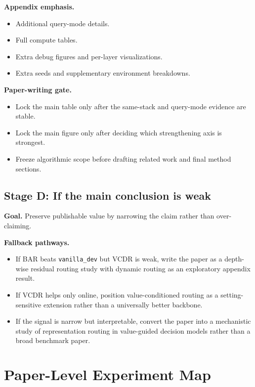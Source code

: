 \documentclass[11pt]{article}
\newcommand{\vanilla}{\texttt{vanilla\_dev}}
\begin{document}
\textbf{Appendix emphasis.}
\begin{itemize}
  \item Additional query-mode details.
  \item Full compute tables.
  \item Extra debug figures and per-layer visualizations.
  \item Extra seeds and supplementary environment breakdowns.
\end{itemize}

\textbf{Paper-writing gate.}
\begin{itemize}
  \item Lock the main table only after the same-stack and query-mode evidence are stable.
  \item Lock the main figure only after deciding which strengthening axis is strongest.
  \item Freeze algorithmic scope before drafting related work and final method sections.
\end{itemize}

\subsection*{Stage D: If the main conclusion is weak}

\textbf{Goal.} Preserve publishable value by narrowing the claim rather than over-claiming.

\textbf{Fallback pathways.}
\begin{itemize}
  \item If BAR beats \vanilla{} but VCDR is weak, write the paper as a depth-wise residual routing study with dynamic routing as an exploratory appendix result.
  \item If VCDR helps only online, position value-conditioned routing as a setting-sensitive extension rather than a universally better backbone.
  \item If the signal is narrow but interpretable, convert the paper into a mechanistic study of representation routing in value-guided decision models rather than a broad benchmark paper.
\end{itemize}

\section{Paper-Level Experiment Map}
\end{document}
